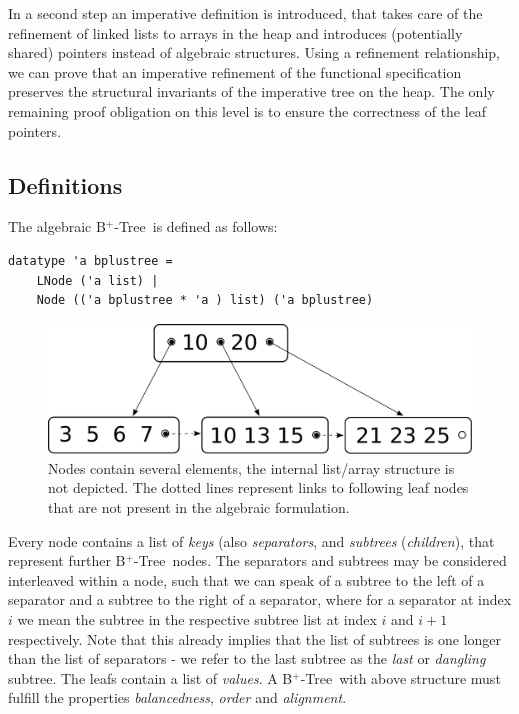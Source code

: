 \documentclass[a4paper,UKenglish,cleveref, autoref, thm-restate]{lipics-v2021}
\newcommand{\btree}{B$^+$-Tree}
\begin{document}
In a second step an imperative definition is introduced,
that takes care of the refinement of linked lists to arrays in the heap
and introduces (potentially shared) pointers instead of algebraic structures.
Using a refinement relationship, we can prove that an imperative refinement
of the functional specification preserves the structural invariants
of the imperative tree on the heap.
The only remaining proof obligation on this level is to ensure the correctness
of the leaf pointers.


\subsection{Definitions}
\label{sec:data_structure_defs}


The algebraic \btree\ is defined as follows:

\begin{lstlisting}[mathescape=true, language=Isabelle,label=lst:btree-def]
datatype 'a bplustree =
    LNode ('a list) |
    Node (('a bplustree * 'a ) list) ('a bplustree)
\end{lstlisting}


\begin{figure}
    \centering
    \includegraphics[width=0.5\linewidth]{btree-basic-nopair.pdf}
    \caption[Visualization of a \btree]
    {Nodes contain several elements, the internal list/array structure is not depicted.
    The dotted lines represent links to following leaf nodes that are not present in the algebraic formulation.}
    \label{fig:btree-basic}
\end{figure}


Every node contains a list of \textit{keys} (also \textit{separators}, and \textit{subtrees} (\textit{children}),
that represent further \btree\ nodes.
The separators and subtrees may be considered interleaved within a node,
such that we can speak of a subtree to the left of a separator and
a subtree to the right of a separator,
where for a separator at index $i$ we mean the subtree in the respective
subtree list at index $i$ and $i+1$ respectively.
Note that this already implies that the list of subtrees is one
longer than the list of separators - we refer to the last subtree
as the \textit{last} or \textit{dangling} subtree.
The leafs contain a list of \textit{values}.
A \btree\ with above structure must fulfill the properties
\textit{balancedness}, \textit{order} and \textit{alignment}.
\end{document}
